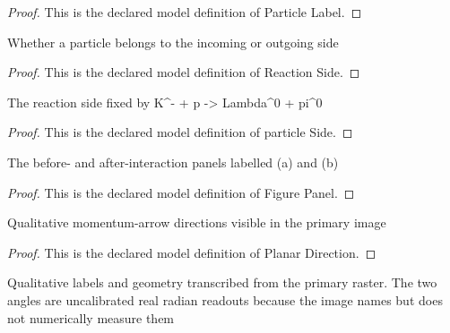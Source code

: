 \begin{proof}
  This is the declared model definition of Particle Label.
\end{proof}
\begin{definition}
  \label{def:physics:phyx-mini-0554:phyxminiproblems-problemphyxmini0554-reactionside}
  Whether a particle belongs to the incoming or outgoing side
\end{definition}
\begin{proof}
  This is the declared model definition of Reaction Side.
\end{proof}
\begin{definition}
  \label{def:physics:phyx-mini-0554:phyxminiproblems-problemphyxmini0554-particleside}
  The reaction side fixed by K\textasciicircum{}- + p -> Lambda\textasciicircum{}0 + pi\textasciicircum{}0
\end{definition}
\begin{proof}
  This is the declared model definition of particle Side.
\end{proof}
\begin{definition}
  \label{def:physics:phyx-mini-0554:phyxminiproblems-problemphyxmini0554-figurepanel}
  The before- and after-interaction panels labelled (a) and (b)
\end{definition}
\begin{proof}
  This is the declared model definition of Figure Panel.
\end{proof}
\begin{definition}
  \label{def:physics:phyx-mini-0554:phyxminiproblems-problemphyxmini0554-planardirection}
  Qualitative momentum-arrow directions visible in the primary image
\end{definition}
\begin{proof}
  This is the declared model definition of Planar Direction.
\end{proof}
\begin{definition}
  \label{def:physics:phyx-mini-0554:phyxminiproblems-problemphyxmini0554-kaonprotonreactionfigure}
  Qualitative labels and geometry transcribed from the primary raster. The two angles are uncalibrated real radian readouts because the image names but does not numerically measure them
\end{definition}
